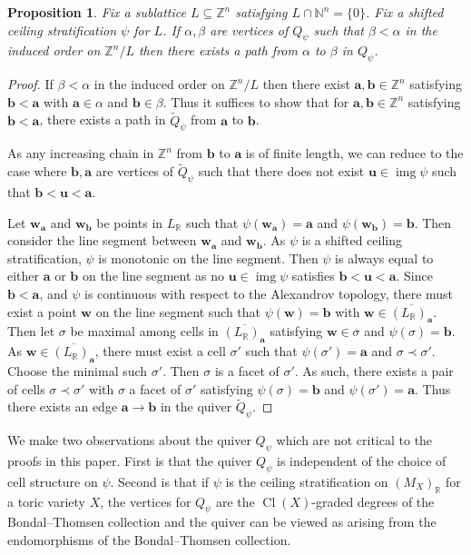 \documentclass{amsart}
\newcommand{\NN}{\mathbb{N}}
\newcommand{\ZZ}{\mathbb{Z}}
\newcommand{\RR}{\mathbb{R}}
\DeclareMathOperator{\Cl}{Cl}
\DeclareMathOperator{\img}{img}
\newtheorem{proposition}[theorem]{Proposition}
\theoremstyle{remark}
\begin{document}
\begin{proposition}
  \label{prop:degree-quiver}
  Fix a sublattice $L\subseteq \ZZ^n$ satisfying $L \cap \NN^{n}=\{0\}$.
  Fix a shifted ceiling stratification $\psi$ for $L$.
  If $\alpha,\beta$ are vertices of $Q_\psi$ such that $\beta<\alpha$ in the induced order on $\ZZ^n/L$ then there exists a path from $\alpha$ to $\beta$ in $Q_\psi$.
\end{proposition}
\begin{proof}
  If $\beta<\alpha$ in the induced order on $\ZZ^n/L$ then there exist $\bm{a},\bm{b}\in \ZZ^n$ satisfying $\bm{b}<\bm{a}$ with $\bm{a}\in \alpha$ and $\bm{b}\in\beta$. 
  Thus it suffices to show that for $\bm{a},\bm{b}\in \ZZ^n$ satisfying $\bm{b}<\bm{a}$, there exists a path in $\widetilde{Q}_\psi$ from $\bm{a}$ to $\bm{b}$.
  
  As any increasing chain in $\ZZ^n$ from $\bm{b}$ to $\bm{a}$ is of finite length, we can reduce to the case where $\bm{b},\bm{a}$ are vertices of $\widetilde{Q}_{\psi}$ such that there does not exist $\bm{u}\in \img \psi$ such that $\bm{b}< \bm{u} < \bm{a}$.
  
  Let $\bm{w}_{\bm{a}}$ and $\bm{w}_{\bm{b}}$ be points in $L_{\RR}$ such that $\psi(\bm{w}_{\bm{a}})=\bm{a}$ and $\psi(\bm{w}_{\bm{b}})=\bm{b}$.
  Then consider the line segment between $\bm{w}_{\bm{a}}$ and $\bm{w}_{\bm{b}}$.
  As $\psi$ is a shifted ceiling stratification, $\psi$ is monotonic on the line segment.
  Then $\psi$ is always equal to either $\bm{a}$ or $\bm{b}$ on the line segment as no $\bm{u}\in \img\psi$ satisfies $\bm{b}< \bm{u} < \bm{a}$.
  Since $\bm{b} < \bm{a}$, and $\psi$ is continuous with respect to the Alexandrov topology,
  there must exist a point $\bm{w}$ on the line segment such that $\psi(\bm{w})=\bm{b}$ with $\bm{w}\in \overline{(L_{\RR})_{\bm{a}}}$.
  Then let $\sigma$ be maximal among cells in $\overline{(L_{\RR})_{\bm{a}}}$ satisfying $\bm{w}\in \overline{\sigma}$ and $\psi(\sigma)=\bm{b}$.
  As $\bm{w}\in \overline{(L_{\RR})_{\bm{a}}}$, there must exist a cell $\sigma'$ such that $\psi(\sigma')=\bm{a}$ and $\sigma\prec \sigma'$.
  Choose the minimal such $\sigma'$. Then $\sigma$ is a facet of $\sigma'$.
  As such, there exists a pair of cells $\sigma\prec\sigma'$ with $\sigma$ a facet of $\sigma'$ satisfying $\psi(\sigma)=\bm{b}$ and $\psi(\sigma')=\bm{a}$.
  Thus there exists an edge $\bm{a}\rightarrow \bm{b}$ in the quiver $\widetilde{Q}_{\psi}$.
\end{proof}

We make two observations about the quiver $Q_\psi$ which are not critical to the proofs in this paper. First is that the quiver $Q_\psi$ is independent of the choice of cell structure on $\psi$. Second is that if $\psi$ is the ceiling stratification on $(M_X)_{\RR}$ for a toric variety $X$, the vertices for $Q_\psi$ are the $\Cl(X)$-graded degrees of the Bondal--Thomsen collection and the quiver can be viewed as arising from the endomorphisms of the Bondal--Thomsen collection.
\end{document}
